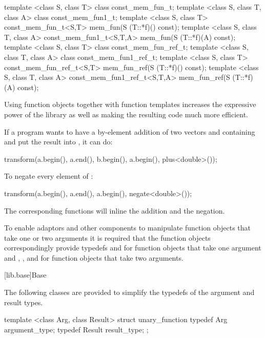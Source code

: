 \begin{codeblock}
{  template <class S, class T> class const_mem_fun_t;
  template <class S, class T, class A> class const_mem_fun1_t;
  template <class S, class T>
    const_mem_fun_t<S,T> mem_fun(S (T::*f)() const);
  template <class S, class T, class A>
    const_mem_fun1_t<S,T,A> mem_fun(S (T::*f)(A) const);
  template <class S, class T> class const_mem_fun_ref_t;
  template <class S, class T, class A> class const_mem_fun1_ref_t;
  template <class S, class T>
    const_mem_fun_ref_t<S,T> mem_fun_ref(S (T::*f)() const);
  template <class S, class T, class A>
    const_mem_fun1_ref_t<S,T,A> mem_fun_ref(S (T::*f)(A) const);
}
\end{codeblock}

\pnum
Using function objects together with function templates increases the
expressive power of the library as well as making the resulting code much
more efficient.

\pnum
\enterexample
If a \Cpp program wants to have a by-element addition of two vectors 
and  containing  and put the result into ,
it can do:

\begin{codeblock}
transform(a.begin(), a.end(), b.begin(), a.begin(), plus<double>());
\end{codeblock}
\exitexampleb

\pnum
\enterexample
To negate every element of :

\begin{codeblock}
transform(a.begin(), a.end(), a.begin(), negate<double>());
\end{codeblock}

The corresponding functions will inline the addition and the negation.
\exitexampleb

\pnum
To enable adaptors and other components to manipulate function objects that take
one or two arguments it is required that the function objects
correspondingly provide typedefs
and
for function objects that take one argument and ,
, and  for function objects
that take two arguments.

[lib.base]{Base}

\pnum
The following classes are provided to simplify the typedefs of the argument
and result types.

%
\begin{codeblock}
template <class Arg, class Result>
struct unary_function {
  typedef Arg    argument_type;
  typedef Result result_type;
};
\end{codeblock}

